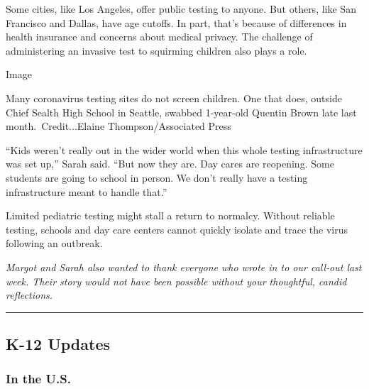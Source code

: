Some cities, like Los Angeles, offer public testing to anyone. But
others, like San Francisco and Dallas, have age cutoffs. In part, that's
because of differences in health insurance and concerns about medical
privacy. The challenge of administering an invasive test to squirming
children also plays a role.

Image

Many coronavirus testing sites do not screen children. One that does,
outside Chief Sealth High School in Seattle, swabbed 1-year-old Quentin
Brown late last month.~Credit...Elaine Thompson/Associated Press

``Kids weren't really out in the wider world when this whole testing
infrastructure was set up,'' Sarah said. ``But now they are. Day cares
are reopening. Some students are going to school in person. We don't
really have a testing infrastructure meant to handle that.''

Limited pediatric testing might stall a return to normalcy. Without
reliable testing, schools and day care centers cannot quickly isolate
and trace the virus following an outbreak.

\emph{Margot and Sarah also wanted to thank everyone who wrote in to our
call-out last week. Their story would not have been possible without
your thoughtful, candid reflections.}

\begin{center}\rule{0.5\linewidth}{\linethickness}\end{center}

\hypertarget{k-12-updates}{%
\subsection{K-12 Updates}\label{k-12-updates}}

\hypertarget{in-the-us}{%
\subsubsection{In the U.S.}\label{in-the-us}}


